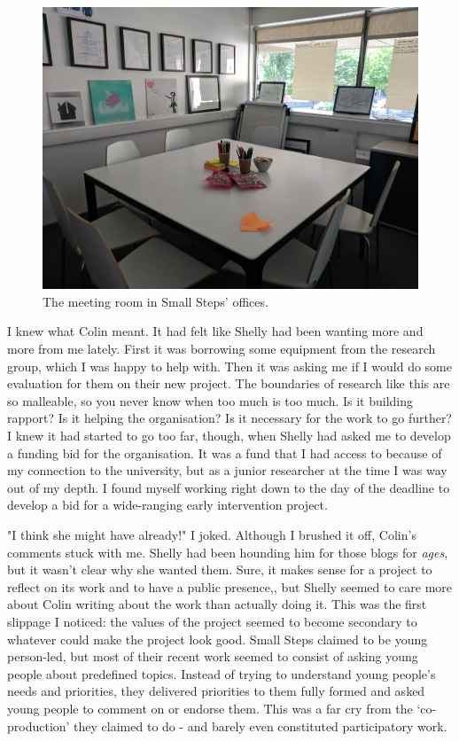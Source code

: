 \begin{figure}
    \centering
    \includegraphics[width=1\linewidth]{Images/3/small-steps.jpg}
    \caption{The meeting room in Small Steps' offices.}
    \label{fig:small-steps}
\end{figure}

I knew what Colin meant. It had felt like Shelly had been wanting more and more from me lately. First it was borrowing some equipment from the research group, which I was happy to help with. Then it was asking me if I would do some evaluation for them on their new project. The boundaries of research like this are so malleable, so you never know when too much is too much. Is it building rapport? Is it helping the organisation? Is it necessary for the work to go further? I knew it had started to go too far, though, when Shelly had asked me to develop a funding bid for the organisation. It was a fund that I had access to because of my connection to the university, but as a junior researcher at the time I was way out of my depth. I found myself working right down to the day of the deadline to develop a bid for a wide-ranging early intervention project. 

"I think she might have already!" I joked. Although I brushed it off, Colin's comments stuck with me. Shelly had been hounding him for those blogs for \textit{ages}, but it wasn't clear why she wanted them. Sure, it makes sense for a project to reflect on its work and to have a public presence,, but Shelly seemed to care more about Colin writing about the work than actually doing it. This was the first slippage I noticed: the values of the project seemed to become secondary to whatever could make the project look good. Small Steps claimed to be young person-led, but most of their recent work seemed to consist of asking young people about predefined topics. Instead of trying to understand young people's needs and priorities, they delivered priorities to them fully formed and asked young people to comment on or endorse them. This was a far cry from the `co-production' they claimed to do - and barely even constituted participatory work. 

